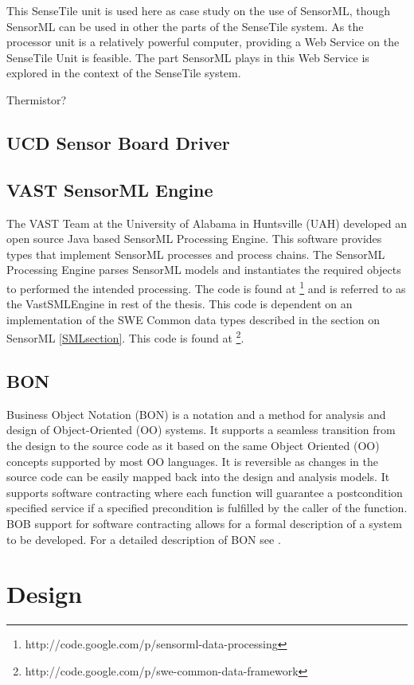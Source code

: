 \documentclass[]{final_report}
\begin{document}
This SenseTile unit is used here as case study on the use of SensorML, though SensorML can be used in other the parts of the SenseTile system. As the processor unit is a relatively powerful computer, providing a Web Service on the SenseTile Unit is feasible. The part SensorML plays in this Web Service is explored in the context of the SenseTile system.

Thermistor?

\section{UCD Sensor Board Driver}\label{SensorBoardDriverSec}


\section{VAST SensorML Engine}\label{VastSensorMLEngineSec}
The VAST Team at the University of Alabama in Huntsville (UAH)  developed an open source Java based SensorML Processing Engine. This software provides types that implement SensorML processes and process  chains. The SensorML Processing Engine parses SensorML models and instantiates the required objects to performed the intended processing. The code is found at \footnote{http://code.google.com/p/sensorml-data-processing} and is referred to as the VastSMLEngine in rest of the thesis. This code is dependent on an implementation of the SWE Common data types described in the section on SensorML \ref{SMLsection}. This code is found at \footnote{http://code.google.com/p/swe-common-data-framework}.


\section{BON} \label{BONsec}
Business Object Notation (BON) is a notation and a method for analysis and design of Object-Oriented (OO) systems. It supports a seamless transition from the design to the source code as it based on the same Object Oriented (OO) concepts supported by most OO languages. It is reversible as changes in the source code can be easily mapped back into the design and analysis models. It supports software contracting where each function will guarantee a postcondition specified service if a specified precondition is fulfilled by the caller of the function. BOB support for software contracting allows for a formal description of a system to be developed. For a detailed description of BON see \cite{BONref}.
\chapter{Design}
\end{document}
